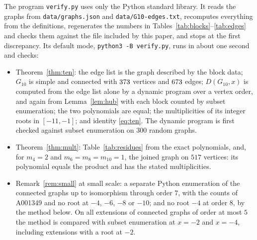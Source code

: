 \documentclass[11pt]{amsart}
\theoremstyle{remark}
\begin{document}
The program \texttt{verify.py} uses only the Python standard library. It reads
the graphs from \texttt{data/graphs.json} and \texttt{data/G10-edges.txt},
recomputes everything from the definitions, regenerates the numbers in
Tables~\ref{tab:blocks}--\ref{tab:edges} and checks them against the file
included by this paper, and stops at the first discrepancy. Its default mode,
\texttt{python3 -B verify.py}, runs in about one second and checks:
\begin{itemize}
\item Theorem~\ref{thm:ten}: the edge list is the graph described by the block
  data; $G_{10}$ is simple and connected with $373$ vertices and
  $673$ edges; $D(G_{10},x)$ is computed from the edge list alone by a
  dynamic program over a vertex order, and again from Lemma~\ref{lem:hub} with
  each block counted by subset enumeration; the two polynomials are equal; the
  multiplicities of its integer roots in $[-11,-1]$; and identity
  \eqref{eq:ten}. The dynamic program is first checked against subset
  enumeration on $300$ random graphs.
\item Theorem~\ref{thm:mult}: Table~\ref{tab:residues} from the exact
  polynomials, and, for $m_4=2$ and $m_6=m_8=m_{10}=1$, the joined graph on
  $517$ vertices: its polynomial equals the product and has the stated
  multiplicities.
\item Remark~\ref{rem:small} at small scale: a separate Python enumeration of
  the connected graphs up to isomorphism through order $7$, with the counts of
  A001349 \cite{OEIS} and no root at $-4$, $-6$, $-8$ or $-10$; and no root $-4$
  at order $8$, by the method below. On all extensions of connected graphs of
  order at most $5$ the method is compared with subset enumeration at $x=-2$
  and $x=-4$, including extensions with a root at $-2$.
\end{itemize}
\end{document}

